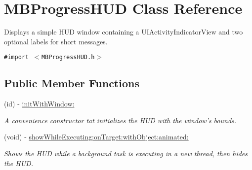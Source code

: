 \hypertarget{interface_m_b_progress_h_u_d}{
\section{MBProgressHUD Class Reference}
\label{interface_m_b_progress_h_u_d}
}
Displays a simple HUD window containing a UIActivityIndicatorView and two optional labels for short messages.  


{\tt \#import $<$MBProgressHUD.h$>$}

\subsection*{Public Member Functions}
\begin{CompactItemize}
\item 
(id) - \hyperlink{interface_m_b_progress_h_u_d_8f3c01167d59153c85ae7efdca7717fc}{initWithWindow:}
\begin{CompactList}\small\item\em A convenience constructor tat initializes the HUD with the window's bounds. \item\end{CompactList}\item 
(void) - \hyperlink{interface_m_b_progress_h_u_d_57143873dfa8d273a17d378886b31cdb}{showWhileExecuting:onTarget:withObject:animated:}
\begin{CompactList}\small\item\em Shows the HUD while a background task is executing in a new thread, then hides the HUD. \item\end{CompactList}\end{CompactItemize}
